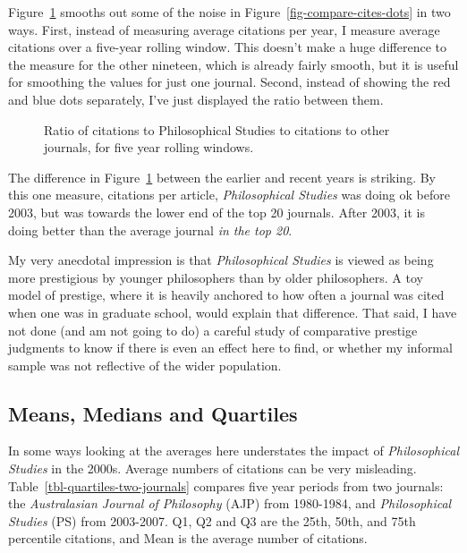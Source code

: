 \documentclass[
  10pt,
  letterpaper,
  DIV=11,
  numbers=noendperiod,
  twoside]{scrartcl}
\begin{document}
Figure~\ref{fig-compare-cites-rolling} smooths out some of the noise in
Figure~\ref{fig-compare-cites-dots} in two ways. First, instead of
measuring average citations per year, I measure average citations over a
five-year rolling window. This doesn't make a huge difference to the
measure for the other nineteen, which is already fairly smooth, but it
is useful for smoothing the values for just one journal. Second, instead
of showing the red and blue dots separately, I've just displayed the
ratio between them.

\begin{figure}


\caption{\label{fig-compare-cites-rolling}Ratio of citations to
Philosophical Studies to citations to other journals, for five year
rolling windows.}

\end{figure}%

The difference in Figure~\ref{fig-compare-cites-rolling} between the
earlier and recent years is striking. By this one measure, citations per
article, \emph{Philosophical Studies} was doing ok before 2003, but was
towards the lower end of the top 20 journals. After 2003, it is doing
better than the average journal \emph{in the top 20}.

My very anecdotal impression is that \emph{Philosophical Studies} is
viewed as being more prestigious by younger philosophers than by older
philosophers. A toy model of prestige, where it is heavily anchored to
how often a journal was cited when one was in graduate school, would
explain that difference. That said, I have not done (and am not going to
do) a careful study of comparative prestige judgments to know if there
is even an effect here to find, or whether my informal sample was not
reflective of the wider population.

\subsection{Means, Medians and Quartiles}\label{sec-means-and-ways}

In some ways looking at the averages here understates the impact of
\emph{Philosophical Studies} in the 2000s. Average numbers of citations
can be very misleading. Table~\ref{tbl-quartiles-two-journals} compares
five year periods from two journals: the \emph{Australasian Journal of
Philosophy} (AJP) from 1980-1984, and \emph{Philosophical Studies} (PS)
from 2003-2007. Q1, Q2 and Q3 are the 25th, 50th, and 75th percentile
citations, and Mean is the average number of citations.
\end{document}
